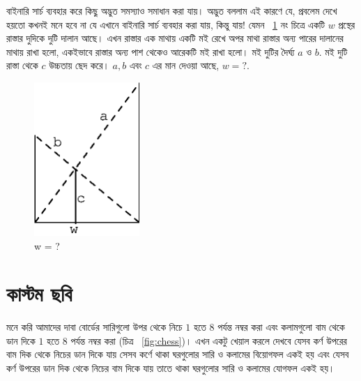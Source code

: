 বাইনারি সার্চ ব্যবহার করে কিছু অদ্ভুত সমস্যাও সমাধান করা যায়। অদ্ভুত বললাম এই কারণে যে, প্রবলেম দেখে হয়তো কখনই মনে হবে না যে এখানে বাইনারি সার্চ ব্যবহার করা যায়, কিন্তু যায়! যেমন ~\ref{fig:ladder} নং চিত্রে একটি $w$ প্রস্থের রাস্তার দুদিকে দুটি দালান আছে। এখন রাস্তার এক মাথায় একটি মই রেখে অপর মাথা রাস্তার অন্য পারের দালানের মাথায় রাখা হলো, একইভাবে রাস্তার অন্য পাশ থেকেও আরেকটি মই রাখা হলো। মই দুটির দৈর্ঘ্য $a$ ও $b$. মই দুটি রাস্তা থেকে $c$ উচ্চতায় ছেদ করে। $a, b$ এবং $c$ এর মান দেওয়া আছে, $w = ?$.

\begin{figure}[ht!]
	\centering
	\includegraphics[width=40mm]{image/chapter_2/ladder.eps}
	\caption{w = ?}
	\label{fig:ladder}
\end{figure}

\section{কাস্টম ছবি}

মনে করি আমাদের দাবা বোর্ডের সারিগুলো উপর থেকে নিচে $1$ হতে $8$ পর্যন্ত নম্বর করা এবং কলামগুলো বাম থেকে ডান দিকে $1$ হতে $8$ পর্যন্ত নম্বর করা (চিত্র ~\ref{fig:chess})। এখন একটু খেয়াল করলে দেখবে যেসব কর্ণ উপরের বাম দিক থেকে নিচের ডান দিকে যায় সেসব কর্ণে থাকা ঘরগুলোর সারি ও কলামের বিয়োগফল একই হয় এবং যেসব কর্ণ উপরের ডান দিক থেকে নিচের বাম দিকে যায় তাতে থাকা ঘরগুলোর সারি ও কলামের যোগফল একই হয়। 

